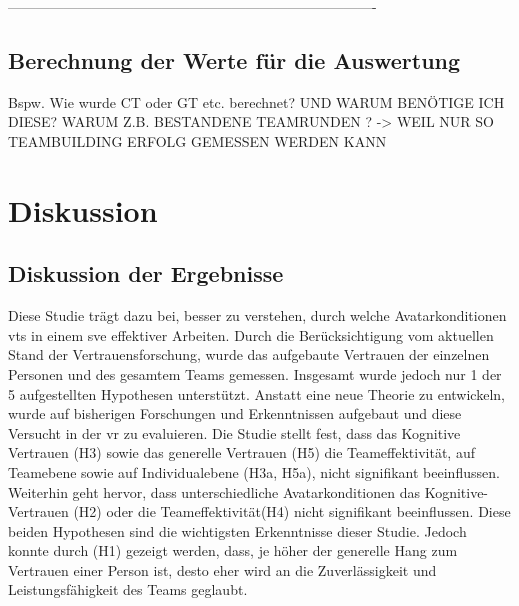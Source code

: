 \documentclass[a4paper,11pt]{article}%
\renewcommand{\\}{\vspace*{0.5\baselineskip} \newline}
\begin{document}
-------------------------------------------------------------------------------



\subsection{Berechnung der Werte für die Auswertung}
Bspw. Wie wurde CT oder GT etc. berechnet? UND WARUM BENÖTIGE ICH DIESE? WARUM Z.B. BESTANDENE TEAMRUNDEN ? -> WEIL NUR SO TEAMBUILDING ERFOLG GEMESSEN WERDEN KANN
\newpage

\clearpage
\newpage

\section{Diskussion}
	\subsection{Diskussion der Ergebnisse}
	Diese Studie trägt dazu bei, besser zu verstehen, durch welche Avatarkonditionen \ac{vts} in einem \ac{sve} effektiver Arbeiten. Durch die Berücksichtigung vom aktuellen Stand der Vertrauensforschung, wurde das aufgebaute Vertrauen der einzelnen Personen und des gesamtem Teams gemessen. Insgesamt wurde jedoch nur 1 der 5 aufgestellten Hypothesen unterstützt. 
Anstatt eine neue Theorie zu entwickeln, wurde auf bisherigen Forschungen und Erkenntnissen aufgebaut und diese Versucht in der \ac{vr} zu evaluieren.
Die Studie stellt fest, dass das Kognitive Vertrauen (H3) sowie das generelle Vertrauen (H5) die Teameffektivität, auf Teamebene sowie auf Individualebene (H3a, H5a), nicht signifikant beeinflussen. 
Weiterhin geht hervor, dass unterschiedliche Avatarkonditionen das Kognitive-Vertrauen (H2) oder die Teameffektivität(H4) nicht signifikant beeinflussen. Diese beiden Hypothesen sind die wichtigsten Erkenntnisse dieser Studie.
Jedoch konnte durch (H1) gezeigt werden, dass, je höher der generelle Hang zum Vertrauen einer Person ist, desto eher wird an die Zuverlässigkeit und Leistungsfähigkeit des Teams geglaubt.
\end{document}
